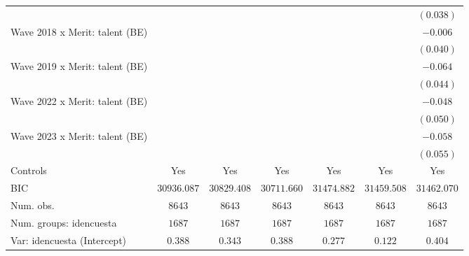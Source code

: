 \documentclass[
  12pt,
]{article}
\begin{document}
\begin{table}
{\begin{center}
{\begin{tabular}{l c c c c c c}
                                                   &               &               &                &              &               & $(0.038)$     \\
Wave 2018 x Merit: talent (BE)                     &               &               &                &              &               & $-0.006$      \\
                                                   &               &               &                &              &               & $(0.040)$     \\
Wave 2019 x Merit: talent (BE)                     &               &               &                &              &               & $-0.064$      \\
                                                   &               &               &                &              &               & $(0.044)$     \\
Wave 2022 x Merit: talent (BE)                     &               &               &                &              &               & $-0.048$      \\
                                                   &               &               &                &              &               & $(0.050)$     \\
Wave 2023 x Merit: talent (BE)                     &               &               &                &              &               & $-0.058$      \\
                                                   &               &               &                &              &               & $(0.055)$     \\
\hline
Controls                                           & Yes           & Yes           & Yes            & Yes          & Yes           & Yes           \\
BIC                                                & $30936.087$   & $30829.408$   & $30711.660$    & $31474.882$  & $31459.508$   & $31462.070$   \\
Num. obs.                                          & $8643$        & $8643$        & $8643$         & $8643$       & $8643$        & $8643$        \\
Num. groups: idencuesta                            & $1687$        & $1687$        & $1687$         & $1687$       & $1687$        & $1687$        \\
Var: idencuesta (Intercept)                        & $0.388$       & $0.343$       & $0.388$        & $0.277$      & $0.122$       & $0.404$       \\

\end{tabular}}
\end{center}}
\end{table}
\end{document}
